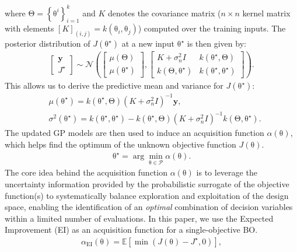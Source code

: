 \documentclass[10pt,twocolumn,twoside]{IEEEtran}
\newcommand{\vect}[1]{\ensuremath{\boldsymbol{\mathrm{#1}}}}
\begin{document}
where $\vect\Theta=\left\{\vect\theta^i\right\}_{i=1}^k$ and $K$ denotes the covariance matrix ($n\times n$ kernel matrix with elements $[K]_{(i,j)}=k(\vect\theta_i,\vect\theta_j)$) computed over the training inputs. The posterior distribution of \(J(\vect{\theta}^\star)\) at a new input \(\vect{\theta}^\star\) is then given by:
\begin{align}\label{eq:post}
\begin{bmatrix}
\mathbf{y} \\
J^\star 
\end{bmatrix}
\sim \mathcal{N}\left(\begin{bmatrix}
\mu(\vect{\Theta}) \\
\mu(\vect{\theta}^\star)
\end{bmatrix}, \begin{bmatrix}
K + \sigma_n^2 I & k(\vect{\theta}^\star, \vect{\Theta}) \\
k(\vect{\Theta}, \vect{\theta}^\star) & k(\vect{\theta}^\star, \vect{\theta}^\star)
\end{bmatrix}\right).
\end{align}
This allows us to derive the predictive mean and variance for $J(\vect{\theta}^\star)$:
\begin{align}\label{eq:mean_var}
&\mu(\vect{\theta}^\star) = k(\vect{\theta}^\star, \vect{\Theta})(K + \sigma_n^2 I)^{-1} \mathbf{y},\\\nonumber
&\sigma^2(\vect{\theta}^\star) = k(\vect{\theta}^\star, \vect{\theta}^\star) - k(\vect{\theta}^\star, \vect{\Theta})(K + \sigma_n^2 I)^{-1}k(\vect{\Theta}, \vect{\theta}^\star).
\end{align}
The updated GP models are then used to induce an acquisition function $\alpha(\vect{\theta})$, which helps find the optimum of the unknown objective function $J(\vect\theta)$. 
\begin{align}
   \vect{\theta}^\star = \arg \min_{\vect{\theta}\in\mathcal{P}} \alpha(\vect{\theta}).
\end{align}
The core idea behind the acquisition function $\alpha(\vect{\theta})$ is to leverage the uncertainty information provided by the probabilistic surrogate of the objective function(s) to systematically balance exploration and exploitation of the design space, enabling the identification of an \textit{optimal} combination of decision variables within a limited number of evaluations. In this paper, we use the Expected Improvement (EI) as an acquisition function for a single-objective BO.
\begin{align}\label{eq:EI}
    \alpha_{\text{EI}}(\vect{\theta}) = \mathbb{E}[\min(J(\vect{\theta})-J^\star, 0)],
\end{align}
\end{document}
